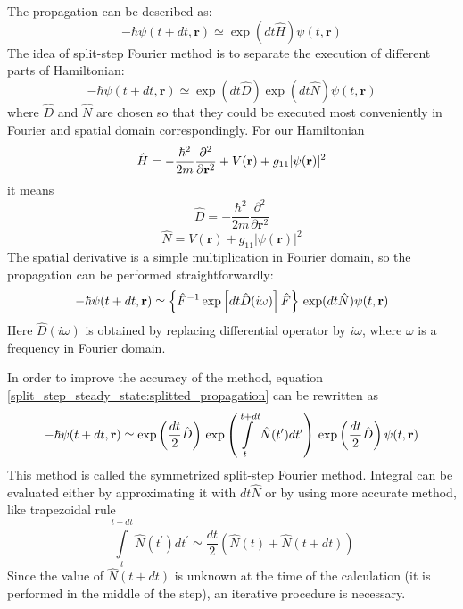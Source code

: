 \documentclass[12pt,notitlepage]{report}
\begin{document}
The propagation can be described as:
\[ -\hbar \psi(t + dt, \mathbf{r}) \simeq \exp(dt \hat{H}) \psi(t, \mathbf{r}) \]
The idea of split-step Fourier method is to separate the execution of different parts of Hamiltonian:
\begin{equation}
\label{split_step_steady_state:splitted_propagation}
-\hbar \psi(t + dt, \mathbf{r}) \simeq \exp(dt \hat{D}) \exp(dt \hat{N}) \psi(t, \mathbf{r})
\end{equation}
where $\hat{D}$ and $\hat{N}$ are chosen so that they could be executed most conveniently in Fourier and spatial
domain correspondingly. For our Hamiltonian
\[ 
\hat{H} = -\frac{\hbar^2}{2m} \frac{\partial^2}{\partial \mathbf{r}^2} + \\
V(\mathbf{r}) + g_{11} \vert \psi(\mathbf{r}) \vert^2 
\]
it means
\[ \hat{D} = -\frac{\hbar^2}{2m} \frac{\partial^2}{\partial \mathbf{r}^2} \]
\[ \hat{N} = V(\mathbf{r}) + g_{11} \vert \psi(\mathbf{r}) \vert^2 \]
The spatial derivative is a simple multiplication in Fourier domain, so the propagation can be performed 
straightforwardly:
\[ 
-\hbar \psi(t + dt, \mathbf{r}) \simeq \left\{ \hat{F}^{-1} \exp \left[ dt \hat{D}(i\omega) \right] \hat{F} \right\} \\
\exp(dt \hat{N}) \psi(t, \mathbf{r}) 
\]
Here $\hat{D}(i\omega)$ is obtained by replacing differential operator by $i \omega$, where $\omega$ is a
frequency in Fourier domain.

In order to improve the accuracy of the method, equation \ref{split_step_steady_state:splitted_propagation}
can be rewritten as
\[
-\hbar \psi(t + dt, \mathbf{r}) \simeq \exp \left( \frac{dt}{2} \hat{D} \right) \\
\exp \left( \int\limits^{t + dt}_t \hat{N} (t^\prime) dt^\prime \right) \\
\exp \left( \frac{dt}{2} \hat{D} \right) \psi(t, \mathbf{r})
\]
This method is called the symmetrized split-step Fourier method. Integral can be evaluated either by approximating it
with $dt\hat{N}$ or by using more accurate method, like trapezoidal rule
\[ \int\limits^{t + dt}_t \hat{N} (t^\prime) dt^\prime \simeq \frac{dt}{2} \left( \hat{N}(t) + \hat{N}(t + dt) \right) \]
Since the value of $\hat{N}(t + dt)$ is unknown at the time of the calculation (it is performed in the
middle of the step), an iterative procedure is necessary.
\end{document}
